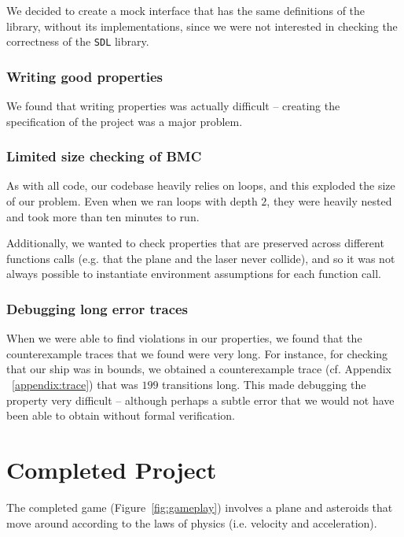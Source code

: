 \documentclass{article}
\begin{document}
We decided to create a mock interface that has the same definitions of the library, without its implementations,
since we were not interested in checking the correctness of the \texttt{SDL} library.

\subsubsection{Writing good properties}
We found that writing properties was actually difficult -- creating the specification of the project was a major problem.


\subsubsection{Limited size checking of BMC}
As with all code, our codebase heavily relies on loops, and this exploded the size of our problem.
Even when we ran loops with depth $2$, they were heavily nested and took more than ten minutes to run.

Additionally, we wanted to check properties that are preserved across different functions calls (e.g. that the plane and the laser never collide), and so it was not always possible to instantiate environment assumptions for each function call.

\subsubsection{Debugging long error traces}
When we were able to find violations in our properties, we found that the counterexample traces that we found were very long.
For instance, for checking that our ship was in bounds, we obtained a counterexample trace (cf. Appendix ~\ref{appendix:trace}) that was $199$ transitions long.
This made debugging the property very difficult -- although perhaps a subtle error that we would not have been able to obtain without formal verification.

\section{Completed Project}
The completed game (Figure~\ref{fig:gameplay}) involves a plane and asteroids that move around according to the laws of physics (i.e. velocity and acceleration).
\end{document}
